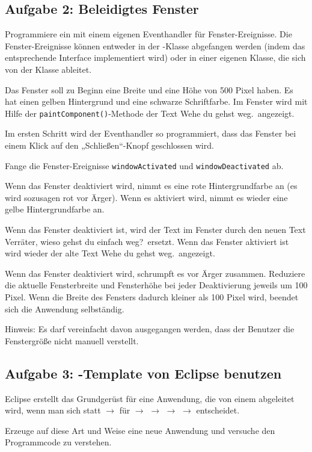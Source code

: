 \subsection{Aufgabe 2: Beleidigtes Fenster}

\begin{compactenum}[a)]
\item Programmiere ein  mit einem eigenen Eventhandler für
Fenster-Ereignisse. Die Fenster-Ereignisse können entweder in der
-Klasse abgefangen werden (indem das entsprechende Interface
implementiert wird) oder in einer eigenen Klasse, die sich von der Klasse
 ableitet.

Das Fenster soll zu Beginn eine Breite und eine Höhe von 500 Pixel haben. Es
hat einen gelben Hintergrund und eine schwarze Schriftfarbe. Im Fenster wird
mit Hilfe der \lstinline|paintComponent()|-Methode der Text \glqq Wehe du gehst
weg.\grqq\ angezeigt.

Im ersten Schritt wird der Eventhandler so programmiert, dass das Fenster bei
einem Klick auf den „Schließen“-Knopf geschlossen wird.

\item Fange die Fenster-Ereignisse \lstinline|windowActivated| und
\lstinline|windowDeactivated| ab.

Wenn das Fenster  deaktiviert wird, nimmt es eine rote Hintergrundfarbe an (es
wird sozusagen rot vor Ärger). Wenn es aktiviert wird, nimmt es wieder eine
gelbe Hintergrundfarbe an.

\item Wenn das Fenster deaktiviert ist, wird der Text im Fenster durch den neuen
Text \glqq Verräter, wieso gehst du einfach weg?\grqq\ ersetzt. Wenn das
Fenster aktiviert ist wird wieder der alte Text \glqq Wehe du gehst weg.\grqq\
angezeigt.

\item Wenn das Fenster deaktiviert wird, schrumpft es vor Ärger zusammen.
Reduziere die aktuelle Fensterbreite und Fensterhöhe bei jeder Deaktivierung
jeweils um 100 Pixel. Wenn die Breite des Fensters dadurch kleiner als 100
Pixel wird, beendet sich die Anwendung selbständig.

Hinweis: Es darf vereinfacht davon ausgegangen werden, dass der Benutzer die
Fenstergröße nicht manuell verstellt.
\end{compactenum}


\subsection{Aufgabe 3: -Template von Eclipse benutzen}

Eclipse erstellt das Grundgerüst für eine Anwendung, die von einem
\myClass{JFrame} abgeleitet wird, wenn man sich statt  $\rightarrow$
\myPMI{Class} für \myPMI{New} $\rightarrow$ \myPMI{Other \ldots}
$\rightarrow$ \myPMI{Window Builder} $\rightarrow$ 
$\rightarrow$ \myPMI{JFrame} entscheidet.

Erzeuge auf diese Art und Weise eine neue Anwendung und versuche den
Programmcode zu verstehen.
